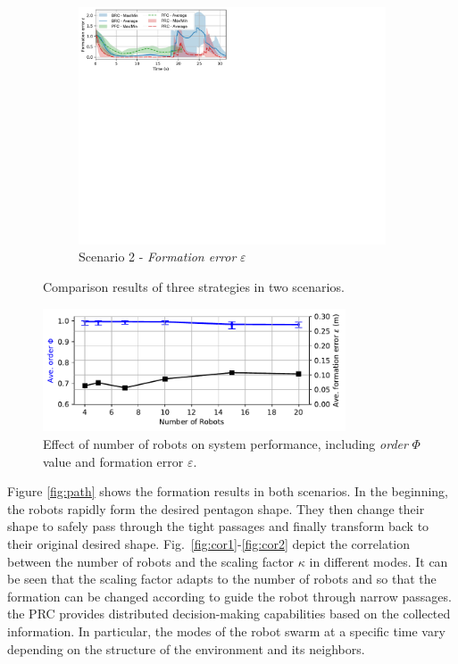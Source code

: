 \begin{figure}
\begin{subfigure}[b]{0.495\textwidth}
    \includegraphics[width=\textwidth]{paper3/images/error_scen2.pdf}
    \caption{Scenario 2 - \textit{Formation error} $\varepsilon$}
    \label{fig:errorr2}
    \end{subfigure}
    \caption{Comparison results of three strategies in two scenarios.}
    \label{fig:comparison}
\end{figure}

\begin{figure}[h!]
    \centering
    \includegraphics[width=0.8\textwidth]{paper3/images/scalability.pdf}
    \caption{Effect of number of robots on system performance, including \textit{order} $\Phi$ value and formation error $\varepsilon$.}
    \label{fig:scalability}
\end{figure}

Figure \ref{fig:path} shows the formation results in both scenarios. In the beginning, the robots rapidly form the desired pentagon shape. They then change their shape to safely pass through the tight passages and finally transform back to their original desired shape. Fig.~\ref{fig:cor1}-\ref{fig:cor2} depict the correlation between the number of robots and the scaling factor $\kappa$ in different modes. It can be seen that the scaling factor adapts to the number of robots and so that the formation can be changed according to guide the robot through narrow passages.  the PRC provides distributed decision-making capabilities based on the collected information. In particular, the modes of the robot swarm at a specific time vary depending on the structure of the environment and its neighbors. 

